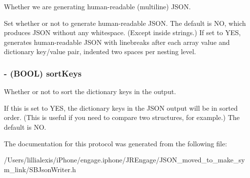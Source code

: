 Whether we are generating human-\/readable (multiline) JSON. 

Set whether or not to generate human-\/readable JSON. The default is NO, which produces JSON without any whitespace. (Except inside strings.) If set to YES, generates human-\/readable JSON with linebreaks after each array value and dictionary key/value pair, indented two spaces per nesting level. \hypertarget{protocol_s_b_json_writer-p_ad424f1c19aead35d04509bfa549f7290}{
\subsubsection[{sortKeys}]{\setlength{\rightskip}{0pt plus 5cm}-\/ (BOOL) sortKeys}}
\label{protocol_s_b_json_writer-p_ad424f1c19aead35d04509bfa549f7290}


Whether or not to sort the dictionary keys in the output. 

If this is set to YES, the dictionary keys in the JSON output will be in sorted order. (This is useful if you need to compare two structures, for example.) The default is NO. 

The documentation for this protocol was generated from the following file:\begin{DoxyCompactItemize}
\item 
/Users/lillialexis/iPhone/engage.iphone/JREngage/JSON\_\-moved\_\-to\_\-make\_\-sym\_\-link/SBJsonWriter.h\end{DoxyCompactItemize}
